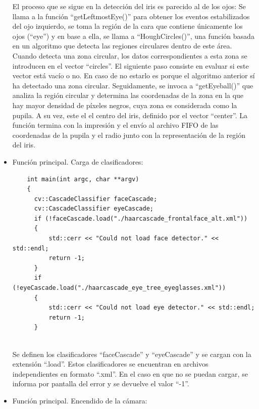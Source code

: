 \begin{itemize}
El proceso que se sigue en la detección del iris es parecido al de los ojos: Se llama a la función ``getLeftmostEye()'' para obtener los eventos estabilizados del ojo izquierdo, se toma la región de la cara que contiene únicamente los ojos (``eye'') y en base a ella, se llama a ``HoughCircles()'', una función basada en un algoritmo que detecta las regiones circulares dentro de este área. Cuando detecta una zona circular, los datos correspondientes a esta zona se introducen en el vector ``circles''. El siguiente paso consiste en evaluar si este vector está vacío o no. En caso de no estarlo es porque el algoritmo anterior sí ha detectado una zona circular. Seguidamente, se invoca a ``getEyeball()'' que analiza la región circular y determina las coordenadas de la zona en la que hay mayor densidad de píxeles negros, cuya zona es considerada como la pupila. A su vez, este el el centro del iris, definido por el vector ``center''. La función termina con la impresión y el envío al archivo FIFO de las coordenadas de la pupila y el radio junto con la representación de la región del iris.

    \item Función principal. Carga de clasificadores: \\
    
    \begin{verbatim}  
    int main(int argc, char **argv)
    {
      cv::CascadeClassifier faceCascade;
      cv::CascadeClassifier eyeCascade;
      if (!faceCascade.load("./haarcascade_frontalface_alt.xml"))
      {
          std::cerr << "Could not load face detector." << std::endl;
          return -1;
      }    
      if (!eyeCascade.load("./haarcascade_eye_tree_eyeglasses.xml"))
      {
          std::cerr << "Could not load eye detector." << std::endl;
          return -1;
      }
    
    \end{verbatim}  
    
    Se definen los clasificadores ``faceCascade'' y ``eyeCascade'' y se cargan con la extensión ``.load''. Estos clasificadores se encuentran en archivos independientes en formato ``.xml''. En el caso en que no se puedan cargar, se informa por pantalla del error y se devuelve el valor ``-1''.
    
    \item Función principal. Encendido de la cámara: \\
    
    \begin{verbatim} 


\end{verbatim}
\end{itemize}
